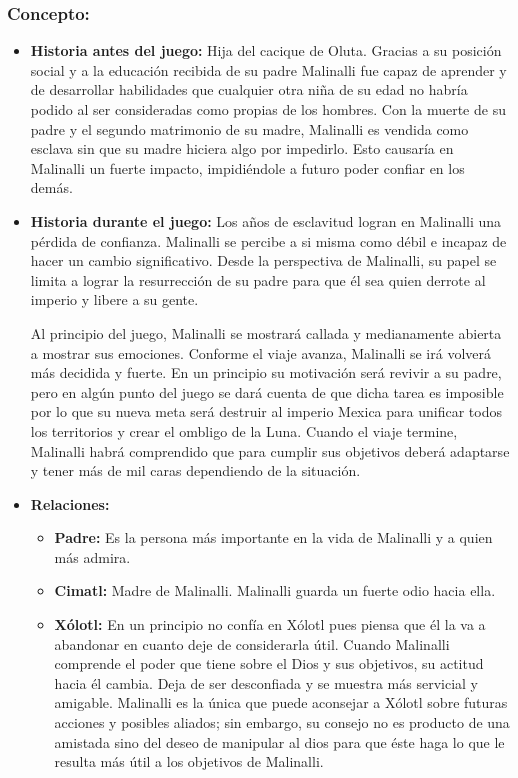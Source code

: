 \documentclass[11pt,letterpaper]{article}
\begin{document}
\subsubsection{Concepto:}
\begin{itemize}
	\item \textbf{Historia antes del juego:}
	Hija del cacique de Oluta. Gracias a su posición social y a la educación recibida de su padre Malinalli fue capaz de aprender y de desarrollar habilidades que cualquier otra niña de su edad no habría podido al ser consideradas como propias de los hombres. Con la muerte de su padre y el segundo matrimonio de su madre, Malinalli es vendida como esclava sin que su madre hiciera algo por impedirlo. Esto causaría en Malinalli un fuerte impacto, impidiéndole a futuro poder confiar en los demás.
	\item \textbf{Historia durante el juego:}
	Los años de esclavitud logran en Malinalli una pérdida de confianza. Malinalli se percibe a si misma como débil e incapaz de hacer un cambio significativo. Desde la perspectiva de Malinalli, su papel se limita a lograr la resurrección de su padre para que él sea quien derrote al imperio y libere a su gente.
	\\
	\par 
	Al principio del juego, Malinalli se mostrará callada y medianamente abierta a mostrar sus emociones. Conforme el viaje avanza, Malinalli se irá volverá más decidida y fuerte. En un principio su motivación será revivir a su padre, pero en algún punto del juego se dará cuenta de que dicha tarea es imposible por lo que su nueva meta será destruir al imperio Mexica para unificar todos los territorios y crear el ombligo de la Luna. Cuando el viaje termine, Malinalli habrá comprendido que para cumplir sus objetivos deberá adaptarse y tener más de mil caras dependiendo de la situación.
	
	\item \textbf{Relaciones:}
	\begin{itemize}
		\item \textbf{Padre:} Es la persona más importante en la vida de Malinalli y a quien más admira.
		\item \textbf{Cimatl: } Madre de Malinalli. Malinalli guarda un fuerte odio hacia ella.
		\item \textbf{Xólotl:} En un principio no confía en Xólotl pues piensa que él la va a abandonar en cuanto deje de considerarla útil. Cuando Malinalli comprende el poder que tiene sobre el Dios y sus objetivos, su actitud hacia él cambia. Deja de ser desconfiada y se muestra más servicial y amigable. Malinalli es la única que puede aconsejar a Xólotl sobre futuras acciones y posibles aliados; sin embargo, su consejo no es producto de una amistada sino del deseo de manipular al dios para que éste haga lo que le resulta más útil a los objetivos de Malinalli. 
	\end{itemize}			  
\end{itemize}
\end{document}
